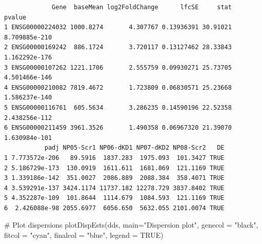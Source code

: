 \documentclass[
  letterpaper,
  DIV=11,
  numbers=noendperiod]{scrartcl}
\newenvironment{Shaded}{\begin{snugshade}}{\end{snugshade}}
\newcommand{\AttributeTok}[1]{\textcolor[rgb]{0.40,0.45,0.13}{#1}}
\newcommand{\CommentTok}[1]{\textcolor[rgb]{0.37,0.37,0.37}{#1}}
\newcommand{\ConstantTok}[1]{\textcolor[rgb]{0.56,0.35,0.01}{#1}}
\newcommand{\DecValTok}[1]{\textcolor[rgb]{0.68,0.00,0.00}{#1}}
\newcommand{\FloatTok}[1]{\textcolor[rgb]{0.68,0.00,0.00}{#1}}
\newcommand{\FunctionTok}[1]{\textcolor[rgb]{0.28,0.35,0.67}{#1}}
\newcommand{\NormalTok}[1]{\textcolor[rgb]{0.00,0.23,0.31}{#1}}
\newcommand{\OtherTok}[1]{\textcolor[rgb]{0.00,0.23,0.31}{#1}}
\newcommand{\SpecialCharTok}[1]{\textcolor[rgb]{0.37,0.37,0.37}{#1}}
\newcommand{\StringTok}[1]{\textcolor[rgb]{0.13,0.47,0.30}{#1}}
\begin{document}
\begin{Shaded}
\end{Shaded}

\begin{verbatim}
             Gene  baseMean log2FoldChange      lfcSE     stat        pvalue
1 ENSG00000224032 1000.8274       4.307767 0.13936391 30.91021 8.709885e-210
2 ENSG00000169242  886.1724       3.720117 0.13127462 28.33843 1.162292e-176
3 ENSG00000107262 1221.1706       2.555759 0.09930271 25.73705 4.501466e-146
4 ENSG00000210082 7819.4672       1.723809 0.06830571 25.23668 1.586237e-140
5 ENSG00000116761  605.5634       3.286235 0.14590196 22.52358 2.438256e-112
6 ENSG00000211459 3961.3526       1.490358 0.06967320 21.39070 1.630984e-101
           padj NP05-Scr1 NP06-dKD1 NP07-dKD2 NP08-Scr2   DE
1 7.773572e-206   89.5916  1837.283  1975.093  101.3427 TRUE
2 5.186729e-173  130.0919  1611.611  1681.869  121.1169 TRUE
3 1.339186e-142  351.0027  2086.889  2088.384  358.4071 TRUE
4 3.539291e-137 3424.1174 11737.182 12278.729 3837.8402 TRUE
5 4.352287e-109  101.8644  1114.679  1084.593  121.1169 TRUE
6  2.426088e-98 2055.6977  6056.650  5632.055 2101.0074 TRUE
\end{verbatim}

\begin{Shaded}
\begin{Highlighting}[]
\CommentTok{\# Plot dispersions}
\FunctionTok{plotDispEsts}\NormalTok{(dds, }\AttributeTok{main=}\StringTok{"Dispersion plot"}\NormalTok{, }\AttributeTok{genecol =} \StringTok{"black"}\NormalTok{, }\AttributeTok{fitcol =} \StringTok{"cyan"}\NormalTok{, }\AttributeTok{finalcol =} \StringTok{"blue"}\NormalTok{, }\AttributeTok{legend =} \ConstantTok{TRUE}\NormalTok{)}
\end{Highlighting}
\end{Shaded}
\end{document}
